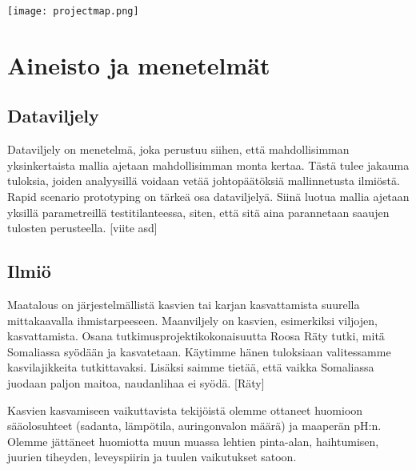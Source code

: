 \documentclass[12pt]{scrreprt}
\begin{document}
  \texttt{[image: projectmap.png]}
  
  
  
  
  
  
  \chapter{Aineisto ja menetelmät}
  
  \section{Dataviljely}
  
  Dataviljely on menetelmä, joka perustuu siihen, että mahdollisimman yksinkertaista
  mallia ajetaan mahdollisimman monta kertaa. Tästä tulee jakauma tuloksia, joiden
  analyysillä voidaan vetää johtopäätöksiä mallinnetusta ilmiöstä. \cite{assimple}
  Rapid scenario prototyping on tärkeä osa dataviljelyä. Siinä luotua mallia ajetaan
  yksillä parametreillä testitilanteessa, siten, että sitä aina parannetaan saaujen
  tulosten perusteella. [viite asd]

  \section{Ilmiö}

  Maatalous on järjestelmällistä kasvien tai karjan kasvattamista suurella mittakaavalla ihmistarpeeseen. Maanviljely on kasvien, esimerkiksi viljojen, kasvattamista.
Osana tutkimusprojektikokonaisuutta Roosa Räty tutki, mitä Somaliassa syödään ja kasvatetaan.  Käytimme hänen tuloksiaan valitessamme kasvilajikkeita tutkittavaksi. Lisäksi saimme tietää, että vaikka Somaliassa juodaan paljon maitoa, naudanlihaa ei syödä. [Räty]

Kasvien kasvamiseen vaikuttavista tekijöistä olemme ottaneet huomioon sääolosuhteet (sadanta, lämpötila, auringonvalon määrä) ja maaperän pH:n. Olemme jättäneet huomiotta muun muassa lehtien pinta-alan, haihtumisen, juurien tiheyden, leveyspiirin ja tuulen vaikutukset satoon.
\end{document}
